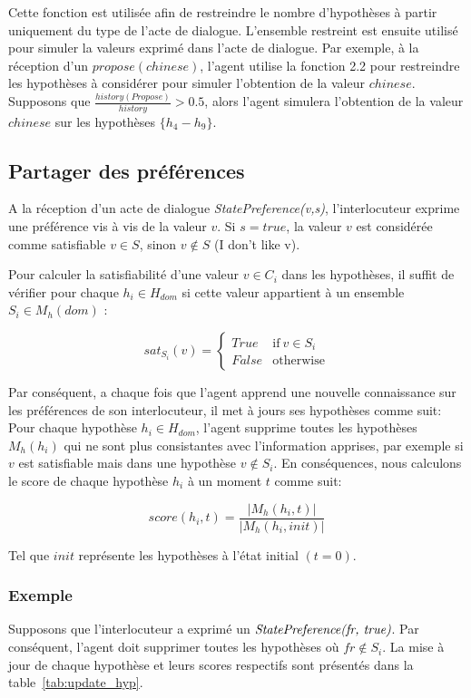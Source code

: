 	Cette fonction est utilisée afin de restreindre le nombre d'hypothèses à partir uniquement du type de l'acte de dialogue. L'ensemble restreint est ensuite utilisé pour simuler la valeurs exprimé dans l'acte de dialogue. Par exemple, à la réception d'un $propose(chinese)$, l'agent utilise la fonction 2.2 pour restreindre les hypothèses à considérer pour simuler l'obtention de la valeur $chinese$. Supposons que $\frac{history(Propose)}{history} > 0.5$, alors l'agent simulera l'obtention de la valeur $chinese$ sur les hypothèses $\{h_4 - h_9\}$.
	
	
	\subsection{Partager des préférences}
		A la réception d'un acte de dialogue \emph{StatePreference(v,s)}, l'interlocuteur exprime une préférence vis à vis de la valeur $v$. Si $s =true$, la valeur $v$ est considérée comme satisfiable $v \in S$, sinon $v \not \in S$ (I don't like v). 
		
		Pour calculer la satisfiabilité d'une valeur  $v \in C_i$ dans les hypothèses, il suffit de vérifier pour chaque $h_i \in H_{dom}$ si cette valeur appartient à un ensemble $S_i \in M_h(dom)$ :
		
				\begin{equation}
				sat_{S_i}(v)= \left\{\begin{array}{ll}
				True	 & \mathrm{if\ }  v \in S_i\\
				False & \mathrm{otherwise}
				\end{array}\right.
				\end{equation}
				
		Par conséquent, a chaque fois que l'agent apprend une nouvelle connaissance sur les préférences de son interlocuteur, il met à jours ses hypothèses  comme suit: 
			Pour chaque hypothèse $h_i \in H_{dom}$, l'agent supprime toutes les hypothèses $M_h(h_i)$ qui ne sont plus consistantes avec l'information apprises, par exemple si $v$ est satisfiable mais dans une hypothèse $v \not \in S_i$. En conséquences, nous calculons le score de chaque hypothèse $h_i$ à un moment $t$ comme suit: 
			
			$$score(h_i,t) = \frac{|M_h(h_i, t)|}{|M_h(h_i, init)|}$$
			
			Tel que $init$ représente les hypothèses à l'état initial $(t=0)$.
		
		\subsubsection{Exemple}
				Supposons que l'interlocuteur a exprimé un  $\emph{StatePreference(fr, true)}$. Par conséquent, l'agent doit supprimer toutes les hypothèses où $fr \not\in S_i$. La mise à jour de chaque hypothèse et leurs scores respectifs sont présentés dans la table~\ref{tab:update_hyp}. 
				
